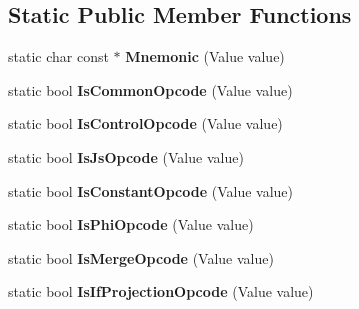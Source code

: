 \subsection*{Static Public Member Functions}
\begin{DoxyCompactItemize}
\item 
static char const $\ast$ {\bfseries Mnemonic} (Value value)\hypertarget{classv8_1_1internal_1_1compiler_1_1_ir_opcode_a2a8d4d3bc860356eb7b53ac149511abb}{}\label{classv8_1_1internal_1_1compiler_1_1_ir_opcode_a2a8d4d3bc860356eb7b53ac149511abb}

\item 
static bool {\bfseries Is\+Common\+Opcode} (Value value)\hypertarget{classv8_1_1internal_1_1compiler_1_1_ir_opcode_a3944a06868cbaa6371e7fd87ab9e733b}{}\label{classv8_1_1internal_1_1compiler_1_1_ir_opcode_a3944a06868cbaa6371e7fd87ab9e733b}

\item 
static bool {\bfseries Is\+Control\+Opcode} (Value value)\hypertarget{classv8_1_1internal_1_1compiler_1_1_ir_opcode_ab6010eaf55a8c961187d3c4234fadae8}{}\label{classv8_1_1internal_1_1compiler_1_1_ir_opcode_ab6010eaf55a8c961187d3c4234fadae8}

\item 
static bool {\bfseries Is\+Js\+Opcode} (Value value)\hypertarget{classv8_1_1internal_1_1compiler_1_1_ir_opcode_a198950864a27301e70d323a3c68949fa}{}\label{classv8_1_1internal_1_1compiler_1_1_ir_opcode_a198950864a27301e70d323a3c68949fa}

\item 
static bool {\bfseries Is\+Constant\+Opcode} (Value value)\hypertarget{classv8_1_1internal_1_1compiler_1_1_ir_opcode_a0c8debc3b479132178de3b181e878fcc}{}\label{classv8_1_1internal_1_1compiler_1_1_ir_opcode_a0c8debc3b479132178de3b181e878fcc}

\item 
static bool {\bfseries Is\+Phi\+Opcode} (Value value)\hypertarget{classv8_1_1internal_1_1compiler_1_1_ir_opcode_a75e2c3c0cc8d9d5c9e69f4d2f83c6937}{}\label{classv8_1_1internal_1_1compiler_1_1_ir_opcode_a75e2c3c0cc8d9d5c9e69f4d2f83c6937}

\item 
static bool {\bfseries Is\+Merge\+Opcode} (Value value)\hypertarget{classv8_1_1internal_1_1compiler_1_1_ir_opcode_a1cac9f3536724226e2a7421ee5ed14bb}{}\label{classv8_1_1internal_1_1compiler_1_1_ir_opcode_a1cac9f3536724226e2a7421ee5ed14bb}

\item 
static bool {\bfseries Is\+If\+Projection\+Opcode} (Value value)\hypertarget{classv8_1_1internal_1_1compiler_1_1_ir_opcode_abb0836c14630f19cbac19747ca8ac329}{}\label{classv8_1_1internal_1_1compiler_1_1_ir_opcode_abb0836c14630f19cbac19747ca8ac329}


\end{DoxyCompactItemize}
